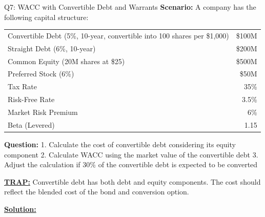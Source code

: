 \documentclass{beamer}
\renewcommand{\scriptsize}{\fontsize{6pt}{7pt}\selectfont}
\begin{document}
	\begin{frame}{Q7: WACC with Convertible Debt and Warrants}
		\scriptsize
		\textbf{Scenario:} A company has the following capital structure:
		
		\begin{tabular}{lr}
			Convertible Debt (5\%, 10-year, convertible into 100 shares per \$1,000) & \$100M \\
			Straight Debt (6\%, 10-year) & \$200M \\
			Common Equity (20M shares at \$25) & \$500M \\
			Preferred Stock (6\%) & \$50M \\
			Tax Rate & 35\% \\
			Risk-Free Rate & 3.5\% \\
			Market Risk Premium & 6\% \\
			Beta (Levered) & 1.15 \\
		\end{tabular}
		
		\textbf{Question:}
		1. Calculate the cost of convertible debt considering its equity component
		2. Calculate WACC using the market value of the convertible debt
		3. Adjust the calculation if 30\% of the convertible debt is expected to be converted
		
		\vspace{2pt}
		\underline{\textbf{TRAP:}} Convertible debt has both debt and equity components. The cost should reflect the blended cost of the bond and conversion option.
		
		\vspace{4pt}
		\underline{\textbf{Solution:}}
	\end{frame}
	
\end{document}
